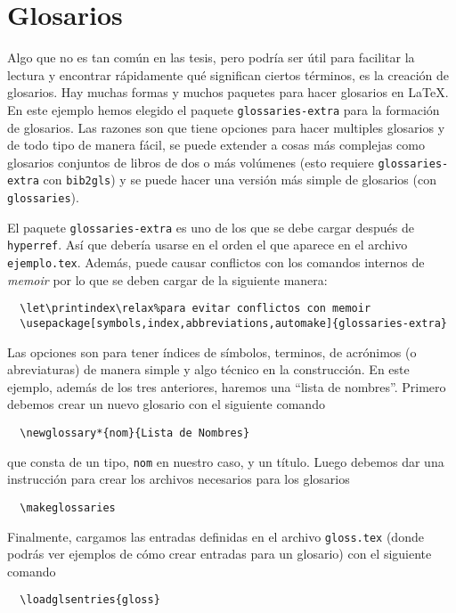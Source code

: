 
\chapter{Glosarios}
\label{cap:glos}
Algo que no es tan común en las tesis, pero podría ser útil para facilitar la
lectura y encontrar rápidamente qué significan ciertos términos, es la creación
de glosarios. Hay muchas formas y muchos paquetes para hacer glosarios en
\LaTeX. En este ejemplo hemos elegido el paquete \texttt{glossaries-extra} para
la formación de glosarios. Las razones son que tiene opciones para hacer
multiples glosarios y de todo tipo de manera fácil, se puede extender a cosas
más complejas como glosarios conjuntos de libros de dos o más volúmenes (esto
requiere \texttt{glossaries-extra} con \texttt{bib2gls}) y se puede hacer una
versión más simple de glosarios (con \texttt{glossaries}).

El paquete \texttt{glossaries-extra} es uno de los que se debe cargar después de \texttt{hyperref}. Así que debería usarse en el orden el que aparece en el archivo \texttt{ejemplo.tex}. Además, puede causar conflictos con los comandos internos de \textit{memoir} por lo que se deben cargar de la siguiente manera:
\begin{verbatim}
  \let\printindex\relax%para evitar conflictos con memoir
  \usepackage[symbols,index,abbreviations,automake]{glossaries-extra}
\end{verbatim}
Las opciones son para tener índices de símbolos, terminos, de acrónimos (o abreviaturas) de manera simple y algo técnico en la construcción. En este ejemplo, además de los tres anteriores, haremos una \enquote{lista de nombres}. Primero debemos crear un nuevo glosario con el siguiente comando
\begin{verbatim}
  \newglossary*{nom}{Lista de Nombres}
\end{verbatim}
que consta de un tipo, \texttt{nom} en nuestro caso, y un título. Luego debemos dar una instrucción para crear los archivos necesarios para los glosarios
\begin{verbatim}
  \makeglossaries
\end{verbatim}
Finalmente, cargamos las entradas definidas en el archivo \texttt{gloss.tex} (donde podrás ver ejemplos de cómo crear entradas para un glosario) con el siguiente comando
\begin{verbatim}
  \loadglsentries{gloss}
\end{verbatim}

